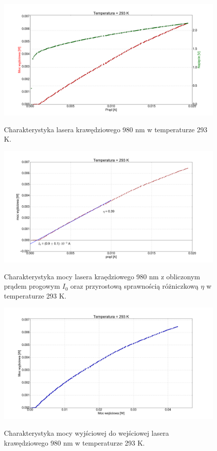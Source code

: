 \documentclass[a4paper, portrait,12pt]{report}
\begin{document}
\begin{figure}
\center
  \includegraphics[scale=0.30]{plot980/temp_20_IVL.png}
  \label{rys1}
  \caption{Charakterystyka lasera krawędziowego 980 nm w temperaturze 293 K.} 
\end{figure}

\begin{figure}
\center
  \includegraphics[scale=0.30]{plot980/temp_20_fit.png}
  \label{rys1}
  \caption{Charakterystyka mocy lasera kraędziowego 980 nm z obliczonym prądem progowym $I_0$ oraz przyrostową sprawnością różniczkową $\eta$ w temperaturze 293 K.} 
\end{figure}

\begin{figure}
\center
  \includegraphics[scale=0.30]{plot980/temp_20_power.png}
  \label{rys1}
  \caption{Charakterystyka mocy wyjściowej do wejściowej lasera krawędziowego 980 nm w temperaturze 293 K.} 
\end{figure}
\end{document}
